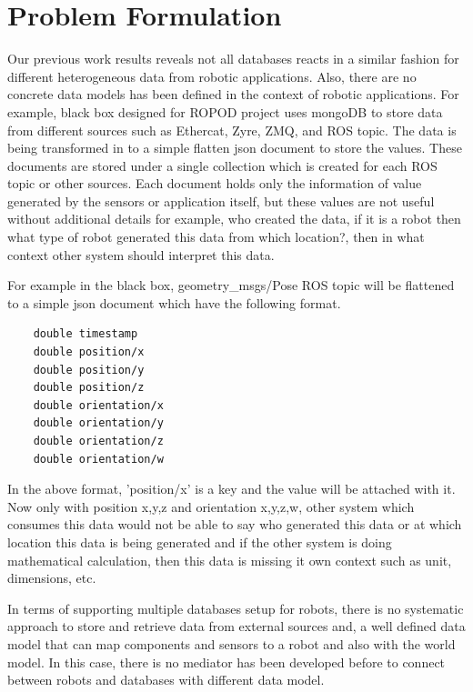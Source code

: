 \documentclass[12pt]{article}
\begin{document}
 

\section{Problem Formulation}

Our previous work results reveals not all databases reacts in a similar fashion for different heterogeneous data from robotic applications. Also, there are no concrete data models has been defined in the context of robotic applications. For example, black box designed for ROPOD project uses mongoDB to store data from different sources such as Ethercat, Zyre, ZMQ, and ROS topic. The data is being transformed in to a simple flatten json document to store the values. These documents are stored under a single collection which is created for each ROS topic or other sources. Each document holds only the information of value generated by the sensors or application itself, but these values are not useful without additional details for example, who created the data, if it is a robot then what type of robot generated this data from which location?, then in what context other system should interpret this data.

For example in the black box, geometry\_msgs/Pose ROS topic will be flattened to a simple json document which have the following format.

\begin{lstlisting}
	double timestamp
	double position/x
	double position/y
	double position/z
	double orientation/x
	double orientation/y
	double orientation/z
	double orientation/w
\end{lstlisting}

In the above format, 'position/x' is a key and the value will be attached with it. Now only with position x,y,z and orientation x,y,z,w, other system which consumes this data would not be able to say who generated this data or at which location this data is being generated and if the other system is doing mathematical calculation, then this data is missing it own context such as unit, dimensions, etc.



In terms of supporting multiple databases setup for robots,  there is no systematic approach to store and retrieve data from external sources and, a well defined data model that can map components and sensors to a robot and also with the world model.
In this case, there is no mediator has been developed before to connect between robots and databases with different data model.
\end{document}
